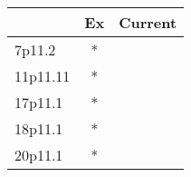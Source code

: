 \begin{tabular}{lcc}
\toprule
{} & Ex & Current \\
\midrule
7p11.2   &  * &         \\
11p11.11 &  * &         \\
17p11.1  &  * &         \\
18p11.1  &  * &         \\
20p11.1  &  * &         \\
\bottomrule
\end{tabular}
